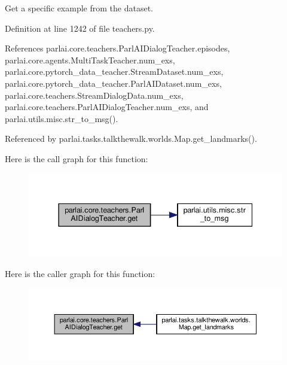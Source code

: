 \begin{DoxyVerb}Get a specific example from the dataset.\end{DoxyVerb}
 

Definition at line 1242 of file teachers.\+py.



References parlai.\+core.\+teachers.\+Parl\+A\+I\+Dialog\+Teacher.\+episodes, parlai.\+core.\+agents.\+Multi\+Task\+Teacher.\+num\+\_\+exs, parlai.\+core.\+pytorch\+\_\+data\+\_\+teacher.\+Stream\+Dataset.\+num\+\_\+exs, parlai.\+core.\+pytorch\+\_\+data\+\_\+teacher.\+Parl\+A\+I\+Dataset.\+num\+\_\+exs, parlai.\+core.\+teachers.\+Stream\+Dialog\+Data.\+num\+\_\+exs, parlai.\+core.\+teachers.\+Parl\+A\+I\+Dialog\+Teacher.\+num\+\_\+exs, and parlai.\+utils.\+misc.\+str\+\_\+to\+\_\+msg().



Referenced by parlai.\+tasks.\+talkthewalk.\+worlds.\+Map.\+get\+\_\+landmarks().

Here is the call graph for this function\+:
\nopagebreak
\begin{figure}[H]
\begin{center}
\leavevmode
\includegraphics[width=337pt]{classparlai_1_1core_1_1teachers_1_1ParlAIDialogTeacher_a0ef5a3bbad31d95bc398a393ab0a310d_cgraph}
\end{center}
\end{figure}
Here is the caller graph for this function\+:
\nopagebreak
\begin{figure}[H]
\begin{center}
\leavevmode
\includegraphics[width=350pt]{classparlai_1_1core_1_1teachers_1_1ParlAIDialogTeacher_a0ef5a3bbad31d95bc398a393ab0a310d_icgraph}
\end{center}
\end{figure}
\mbox{\label{classparlai_1_1core_1_1teachers_1_1ParlAIDialogTeacher_aee1494d5dd0610530b4b93e56010e6f8}} 
